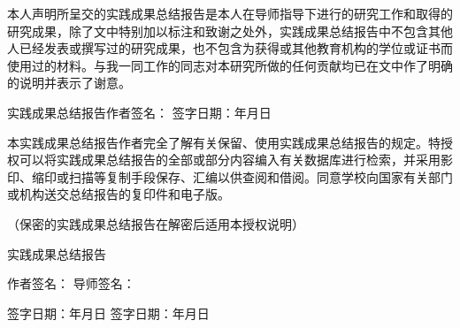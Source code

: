 
\clearpage{\cleardoublepage} %
\thispagestyle{empty} %
\setlength{\baselineskip}{20pt} %

\vspace*{1cm}

\begin{center}\end{center}

\vspace{0.5cm}

本人声明所呈交的实践成果总结报告是本人在导师指导下进行的研究工作和取得的研究成果，除了文中特别加以标注和致谢之处外，实践成果总结报告中不包含其他人已经发表或撰写过的研究成果，也不包含为获得{\underline{\textbf{}}}或其他教育机构的学位或证书而使用过的材料。与我一同工作的同志对本研究所做的任何贡献均已在文中作了明确的说明并表示了谢意。

\vspace{1.5cm}

\noindent 实践成果总结报告作者签名：\makebox[3cm][s]{} 签字日期：\makebox[1.5cm][s]{}年\makebox[0.7cm][s]{}月\makebox[0.7cm][s]{}日

\vspace{2.5cm}

\begin{center}\end{center}

\vspace{1cm}

本实践成果总结报告作者完全了解{\underline{}}有关保留、使用实践成果总结报告的规定。特授权{\underline{}}可以将实践成果总结报告的全部或部分内容编入有关数据库进行检索，并采用影印、缩印或扫描等复制手段保存、汇编以供查阅和借阅。同意学校向国家有关部门或机构送交总结报告的复印件和电子版。

\hspace{2em}（保密的实践成果总结报告在解密后适用本授权说明）

\vspace{2.2cm}

\noindent 实践成果总结报告

\noindent 作者签名：\makebox[4cm][s]{} 导师签名：\makebox[4cm][s]{}

\vspace{0.8cm}

\noindent 签字日期：\makebox[1.5cm][s]{}年\makebox[1cm][s]{}月\makebox[1cm][s]{}日
\qquad 签字日期：\makebox[1.5cm][s]{}年\makebox[1cm][s]{}月\makebox[1cm][s]{}日
